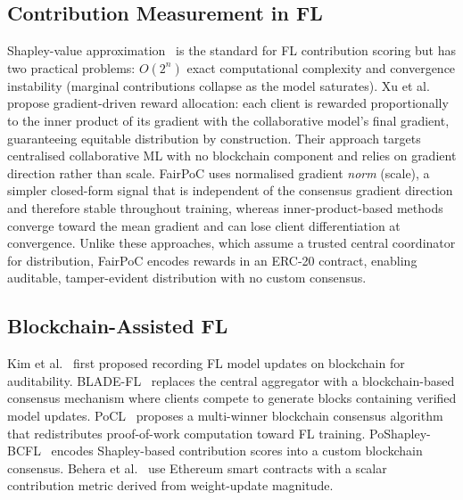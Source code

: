 \documentclass[conference]{IEEEtran}
\theoremstyle{remark}
\begin{document}
\subsection{Contribution Measurement in FL}

Shapley-value approximation~\cite{shapley1953value, song2019profit,
wang2020measure} is the standard for FL contribution scoring but has two
practical problems: $O(2^n)$ exact computational complexity and
convergence instability (marginal contributions collapse as the model
saturates).
Xu et al.~\cite{gradient_driven_fairness2021} propose gradient-driven
reward allocation: each client is rewarded proportionally to the inner
product of its gradient with the collaborative model's final gradient,
guaranteeing equitable distribution by construction.
Their approach targets centralised collaborative ML with no blockchain
component and relies on gradient direction rather than scale.
FairPoC uses normalised gradient \emph{norm} (scale), a simpler
closed-form signal that is independent of the consensus gradient
direction and therefore stable throughout training, whereas
inner-product-based methods converge toward the mean gradient and
can lose client differentiation at convergence.
Unlike these approaches, which assume a trusted central coordinator for
distribution, FairPoC encodes rewards in an ERC-20 contract, enabling
auditable, tamper-evident distribution with no custom consensus.

\subsection{Blockchain-Assisted FL}

Kim et al.~\cite{kim2019blockchained} first proposed recording FL model
updates on blockchain for auditability. BLADE-FL~\cite{bladefl2022}
replaces the central aggregator with a blockchain-based consensus
mechanism where clients compete to generate blocks containing verified
model updates. PoCL~\cite{pocl2024} proposes a multi-winner blockchain
consensus algorithm that redistributes proof-of-work computation toward
FL training. PoShapley-BCFL~\cite{poshapley2023} encodes Shapley-based
contribution scores into a custom blockchain consensus. Behera et
al.~\cite{behera2021federated} use Ethereum smart contracts with a
scalar contribution metric derived from weight-update magnitude.
\end{document}
